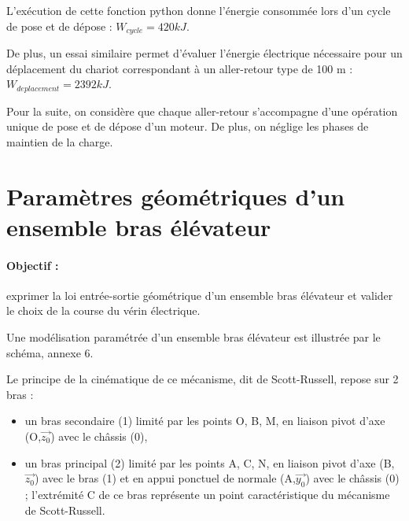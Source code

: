 L'exécution de cette fonction python donne l'énergie consommée lors d'un cycle de pose et de dépose : $W_{cycle} = 420 kJ$.

De plus, un essai similaire permet d'évaluer l'énergie électrique nécessaire pour un déplacement du chariot correspondant à un aller-retour type de 100 m : $W_{deplacement} = 2 392 kJ$.


Pour la suite, on considère que chaque aller-retour s'accompagne d'une opération unique de pose et de dépose d'un moteur. De plus, on néglige les phases de maintien de la charge.




\section{Paramètres géométriques d'un ensemble bras élévateur}

\paragraph{Objectif :} exprimer la loi entrée-sortie géométrique d'un ensemble bras élévateur et valider le choix de la course du vérin électrique.

Une modélisation paramétrée d'un ensemble bras élévateur est illustrée par le schéma, annexe 6.

Le principe de la cinématique de ce mécanisme, dit de Scott-Russell, repose sur 2 bras :
\begin{itemize}
 \item un bras secondaire (1) limité par les points O, B, M, en liaison pivot d'axe (O,$\vec{z_0}$) avec le châssis (0),
 \item un bras principal (2) limité par les points A, C, N, en liaison pivot d'axe (B,$\vec{z_0}$) avec le bras (1) et en appui ponctuel de normale (A,$\vec{y_0}$) avec le châssis (0) ; l'extrémité C de ce bras représente un
point caractéristique du mécanisme de Scott-Russell.
\end{itemize}


